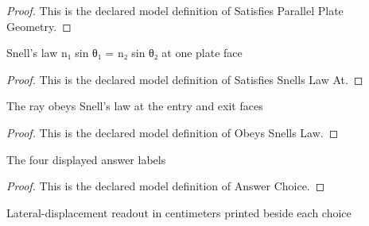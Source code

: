 \begin{proof}
  This is the declared model definition of Satisfies Parallel Plate Geometry.
\end{proof}
\begin{definition}
  \label{def:physics:phyx-mini-0102:phyxminiproblems-problemphyxmini0102-satisfiessnellslawat}
  Snell's law n₁ sin θ₁ = n₂ sin θ₂ at one plate face
\end{definition}
\begin{proof}
  This is the declared model definition of Satisfies Snells Law At.
\end{proof}
\begin{definition}
  \label{def:physics:phyx-mini-0102:phyxminiproblems-problemphyxmini0102-obeyssnellslaw}
  The ray obeys Snell's law at the entry and exit faces
\end{definition}
\begin{proof}
  This is the declared model definition of Obeys Snells Law.
\end{proof}
\begin{definition}
  \label{def:physics:phyx-mini-0102:phyxminiproblems-problemphyxmini0102-answerchoice}
  The four displayed answer labels
\end{definition}
\begin{proof}
  This is the declared model definition of Answer Choice.
\end{proof}
\begin{definition}
  \label{def:physics:phyx-mini-0102:phyxminiproblems-problemphyxmini0102-answerchoice-displacementcentimeters}
  Lateral-displacement readout in centimeters printed beside each choice
\end{definition}
